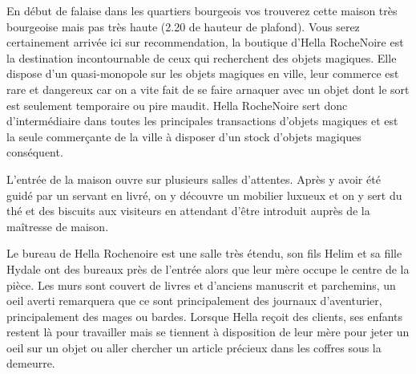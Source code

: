 En début de falaise dans les quartiers bourgeois vos trouverez cette
maison très bourgeoise mais pas très haute (2.20 de hauteur de plafond).
Vous serez certainement arrivée ici sur recommendation, la boutique 
d'Hella RocheNoire est la destination incontournable de ceux qui 
recherchent des objets magiques. Elle dispose d'un quasi-monopole sur
les objets magiques en ville, leur commerce est rare et dangereux car
on a vite fait de se faire arnaquer avec un objet dont le sort est 
seulement temporaire ou pire maudit. Hella RocheNoire sert donc 
d'intermédiaire dans toutes les principales transactions d'objets
magiques et est la seule commerçante de la ville à disposer d'un stock
d'objets magiques conséquent.

L'entrée de la maison ouvre sur plusieurs salles d'attentes. Après y avoir
été guidé par un servant en livré, on y découvre un mobilier luxueux et on 
y sert du thé et des biscuits aux visiteurs en attendant d'être introduit
auprès de la maîtresse de maison.

Le bureau de Hella Rochenoire est une salle très étendu, son fils Helim 
et sa fille Hydale ont des bureaux près de l'entrée alors que leur mère 
occupe le centre de la pièce. Les murs sont couvert de livres et d'anciens 
manuscrit et parchemins, un oeil averti remarquera que ce sont principalement 
des journaux d'aventurier, principalement des mages ou bardes. Lorsque Hella 
reçoit des clients, ses enfants restent là pour travailler mais se tiennent 
à disposition de leur mère pour jeter un oeil sur un objet ou aller chercher 
un article précieux dans les coffres sous la demeurre.

